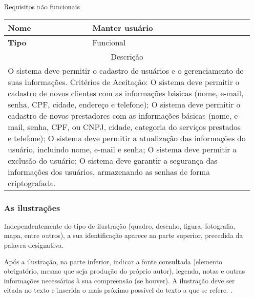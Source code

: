 \begin{quadro}[htb]
	\centering
	\caption{\label{Formatação do texto.}Requisitos não funcionais}	
	\begin{tabular}{|l|p{11cm}|}
		\hline
		\textbf{Nome}    & Manter usuário\\ \hline
		\textbf{Tipo}    & Funcional\\ \hline
		\multicolumn{2}{|c|}{Descrição}\\ \hline
		\multicolumn{2}{|p{12cm}|}{
			O sistema deve permitir o cadastro de usuários e o gerenciamento de suas informações. \newline
			\newline Critérios de Aceitação: \newline
			O sistema deve permitir o cadastro de novos clientes com as informações básicas (nome, e-mail, senha, CPF, cidade, endereço e telefone); \newline
			\newline O sistema deve permitir o cadastro de novos prestadores com as informações básicas (nome, e-mail, senha, CPF, ou CNPJ, cidade, categoria do serviços prestados e telefone); \newline
			\newline O sistema deve permitir a atualização das informações do usuário, incluindo nome, e-mail e senha; \newline
			\newline O sistema deve permitir a exclusão do usuário; \newline
			O sistema deve garantir a segurança das informações dos usuários, armazenando as senhas de forma criptografada.
			} \\ \hline
	\end{tabular}
\end{quadro}



\subsubsection{As ilustrações}

Independentemente do tipo de ilustração (quadro, desenho, figura, fotografia, mapa, entre outros), a sua identificação aparece na parte superior, precedida da palavra designativa. 

\begin{citacao}
	Após a ilustração, na parte inferior, indicar a fonte consultada (elemento obrigatório, mesmo que seja produção do próprio autor), legenda, notas e outras informações necessárias à sua compreensão (se houver). A ilustração deve ser citada no texto e inserida o mais próximo possível do texto a que se refere. \cite[p. 11]{NBR14724:2011}.
\end{citacao}

